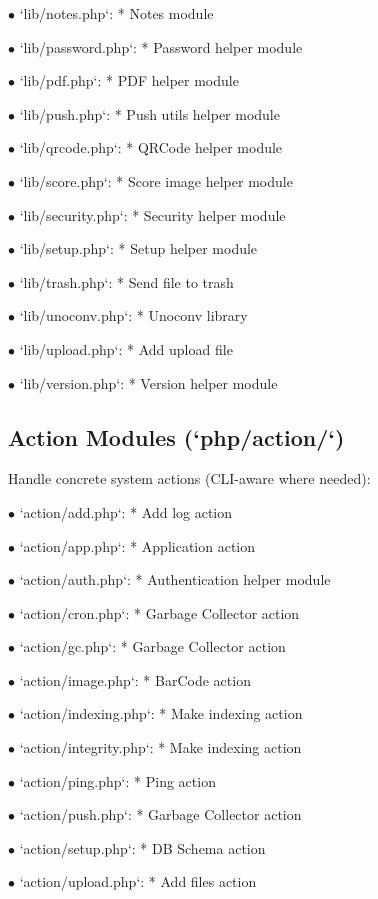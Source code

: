 \documentclass[a4paper]{article}
\begin{document}
\begin{compactitem}
\item[\color{myblue}$\bullet$] `lib/notes.php`: * Notes module
\item[\color{myblue}$\bullet$] `lib/password.php`: * Password helper module
\item[\color{myblue}$\bullet$] `lib/pdf.php`: * PDF helper module
\item[\color{myblue}$\bullet$] `lib/push.php`: * Push utils helper module
\item[\color{myblue}$\bullet$] `lib/qrcode.php`: * QRCode helper module
\item[\color{myblue}$\bullet$] `lib/score.php`: * Score image helper module
\item[\color{myblue}$\bullet$] `lib/security.php`: * Security helper module
\item[\color{myblue}$\bullet$] `lib/setup.php`: * Setup helper module
\item[\color{myblue}$\bullet$] `lib/trash.php`: * Send file to trash
\item[\color{myblue}$\bullet$] `lib/unoconv.php`: * Unoconv library
\item[\color{myblue}$\bullet$] `lib/upload.php`: * Add upload file
\item[\color{myblue}$\bullet$] `lib/version.php`: * Version helper module
\end{compactitem}

\hypertarget{toc10}{}
\subsection{Action Modules (`php/action/`)}

Handle concrete system actions (CLI-aware where needed):

\begin{compactitem}
\item[\color{myblue}$\bullet$] `action/add.php`: * Add log action
\item[\color{myblue}$\bullet$] `action/app.php`: * Application action
\item[\color{myblue}$\bullet$] `action/auth.php`: * Authentication helper module
\item[\color{myblue}$\bullet$] `action/cron.php`: * Garbage Collector action
\item[\color{myblue}$\bullet$] `action/gc.php`: * Garbage Collector action
\item[\color{myblue}$\bullet$] `action/image.php`: * BarCode action
\item[\color{myblue}$\bullet$] `action/indexing.php`: * Make indexing action
\item[\color{myblue}$\bullet$] `action/integrity.php`: * Make indexing action
\item[\color{myblue}$\bullet$] `action/ping.php`: * Ping action
\item[\color{myblue}$\bullet$] `action/push.php`: * Garbage Collector action
\item[\color{myblue}$\bullet$] `action/setup.php`: * DB Schema action
\item[\color{myblue}$\bullet$] `action/upload.php`: * Add files action
\end{compactitem}
\end{document}
